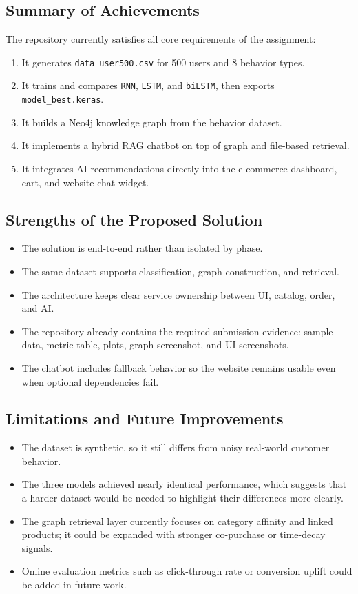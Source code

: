 \documentclass[12pt,a4paper]{article}
\begin{document}
\subsection{Summary of Achievements}
The repository currently satisfies all core requirements of the assignment:
\begin{enumerate}[label=\arabic*.]
  \item It generates \texttt{data\_user500.csv} for 500 users and 8 behavior types.
  \item It trains and compares \texttt{RNN}, \texttt{LSTM}, and \texttt{biLSTM}, then exports \texttt{model\_best.keras}.
  \item It builds a Neo4j knowledge graph from the behavior dataset.
  \item It implements a hybrid RAG chatbot on top of graph and file-based retrieval.
  \item It integrates AI recommendations directly into the e-commerce dashboard, cart, and website chat widget.
\end{enumerate}

\subsection{Strengths of the Proposed Solution}
\begin{itemize}
  \item The solution is end-to-end rather than isolated by phase.
  \item The same dataset supports classification, graph construction, and retrieval.
  \item The architecture keeps clear service ownership between UI, catalog, order, and AI.
  \item The repository already contains the required submission evidence: sample data, metric table, plots, graph screenshot, and UI screenshots.
  \item The chatbot includes fallback behavior so the website remains usable even when optional dependencies fail.
\end{itemize}

\subsection{Limitations and Future Improvements}
\begin{itemize}
  \item The dataset is synthetic, so it still differs from noisy real-world customer behavior.
  \item The three models achieved nearly identical performance, which suggests that a harder dataset would be needed to highlight their differences more clearly.
  \item The graph retrieval layer currently focuses on category affinity and linked products; it could be expanded with stronger co-purchase or time-decay signals.
  \item Online evaluation metrics such as click-through rate or conversion uplift could be added in future work.
\end{itemize}
\end{document}
